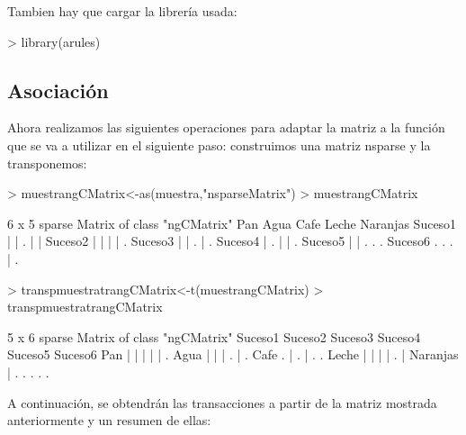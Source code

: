 \documentclass [a4paper] {article}
\begin{document}
Tambien hay que cargar la librería usada:

\begin{Schunk}
\begin{Sinput}
> library(arules)
\end{Sinput}
\end{Schunk}

\subsection{Asociación}
Ahora realizamos las siguientes operaciones para adaptar la matriz a la función
que se va a utilizar en el siguiente paso: construimos una matriz nsparse y 
la transponemos:

\begin{Schunk}
\begin{Sinput}
> muestrangCMatrix<-as(muestra,"nsparseMatrix")
> muestrangCMatrix
\end{Sinput}
\begin{Soutput}
6 x 5 sparse Matrix of class "ngCMatrix"
        Pan Agua Cafe Leche Naranjas
Suceso1   |    |    .     |        |
Suceso2   |    |    |     |        .
Suceso3   |    |    .     |        .
Suceso4   |    .    |     |        .
Suceso5   |    |    .     .        .
Suceso6   .    .    .     |        .
\end{Soutput}
\begin{Sinput}
> transpmuestratrangCMatrix<-t(muestrangCMatrix)
> transpmuestratrangCMatrix
\end{Sinput}
\begin{Soutput}
5 x 6 sparse Matrix of class "ngCMatrix"
         Suceso1 Suceso2 Suceso3 Suceso4 Suceso5 Suceso6
Pan            |       |       |       |       |       .
Agua           |       |       |       .       |       .
Cafe           .       |       .       |       .       .
Leche          |       |       |       |       .       |
Naranjas       |       .       .       .       .       .
\end{Soutput}
\end{Schunk}
A continuación, se obtendrán las transacciones a partir de la matriz mostrada anteriormente y un resumen de ellas:
\end{document}
